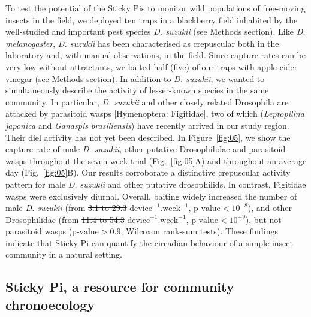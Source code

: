\documentclass[12pt]{article}
\providecommand{\DIFaddtex}[1]{{\protect\color{blue}\uwave{#1}}} %
\providecommand{\DIFdeltex}[1]{{\protect\color{red}\sout{#1}}}                      %
\providecommand{\DIFaddbegin}{} %
\providecommand{\DIFaddend}{} %
\providecommand{\DIFdelbegin}{} %
\providecommand{\DIFdelend}{} %
\providecommand{\DIFadd}[1]{\texorpdfstring{\DIFaddtex{#1}}{#1}} %
\providecommand{\DIFdel}[1]{\texorpdfstring{\DIFdeltex{#1}}{}} %
\newcommand{\DIFscaledelfig}{0.5}
\newlength{\DIFdelgraphicswidth} %
\newlength{\DIFdelgraphicsheight} %
\newcommand{\DIFaddincludegraphics}[2][]{{\color{blue}\fbox{\DIFOincludegraphics[#1]{#2}}}} %
\newcommand{\DIFdelincludegraphics}[2][]{%
\sbox{\DIFdelgraphicsbox}{\DIFOincludegraphics[#1]{#2}}%
\settoboxwidth{\DIFdelgraphicswidth}{\DIFdelgraphicsbox} %
\settoboxtotalheight{\DIFdelgraphicsheight}{\DIFdelgraphicsbox} %
\scalebox{\DIFscaledelfig}{%
\parbox[b]{\DIFdelgraphicswidth}{\usebox{\DIFdelgraphicsbox}\\[-\baselineskip] \rule{\DIFdelgraphicswidth}{0em}}\llap{\resizebox{\DIFdelgraphicswidth}{\DIFdelgraphicsheight}{%
\setlength{\unitlength}{\DIFdelgraphicswidth}%
\begin{picture}(1,1)%
\thicklines\linethickness{2pt} %
{\color[rgb]{1,0,0}\put(0,0){\framebox(1,1){}}}%
{\color[rgb]{1,0,0}\put(0,0){\line( 1,1){1}}}%
{\color[rgb]{1,0,0}\put(0,1){\line(1,-1){1}}}%
\end{picture}%
}\hspace*{3pt}}} %
} %
\DeclareRobustCommand{\DIFaddbegin}{\DIFOaddbegin \let\includegraphics\DIFaddincludegraphics} %
\DeclareRobustCommand{\DIFaddend}{\DIFOaddend \let\includegraphics\DIFOincludegraphics} %
\DeclareRobustCommand{\DIFdelbegin}{\DIFOdelbegin \let\includegraphics\DIFdelincludegraphics} %
\DeclareRobustCommand{\DIFdelend}{\DIFOaddend \let\includegraphics\DIFOincludegraphics} %
\begin{document}
\begin{linenumbers}
		To test the potential of the Sticky Pis to monitor wild populations of free-moving insects in the field, we deployed ten traps in a blackberry field inhabited by the well-studied and important pest species \emph{D. suzukii} (see Methods section). Like \emph{D. melanogaster}, \emph{D. suzukii} has been characterised as crepuscular both in the laboratory\cite{shaw_control_2019} and, with manual observations, in the field\cite{swoboda-bhattarai_diurnal_2020}. Since capture rates can be very low without attractants\cite{swoboda-bhattarai_diurnal_2020}, we baited half (five) of our traps with apple cider vinegar (see Methods section). In addition to \emph{D. suzukii}, we wanted to simultaneously describe the activity of lesser-known species in the same community. In particular, \emph{D. suzukii} and other closely related Drosophila are attacked by parasitoid wasps [Hymenoptera: Figitidae], two of which (\emph{Leptopilina japonica} and \emph{Ganaspis brasiliensis}) have recently arrived in our study region\cite{abram_new_2020}. Their diel activity has not yet been described. In Figure~\ref{fig:05}, we show the capture rate of male \emph{D. suzukii}, other putative Drosophilidae and parasitoid wasps throughout the seven-week trial (Fig.~\ref{fig:05}A) and throughout an average day (Fig.~\ref{fig:05}B). Our results corroborate a distinctive crepuscular activity pattern for male \emph{D. suzukii} and other putative drosophilids. In contrast, Figitidae wasps were exclusively diurnal. Overall, baiting widely increased the number of male \emph{D. suzukii} (from \DIFdelbegin \DIFdel{3.1 to 29.3 }\DIFdelend \DIFaddbegin \DIFadd{3.0 to 26.0 }\DIFaddend $\text{device}^{-1}.\text{week}^{-1}$, \DIFdelbegin \DIFdel{$\text{p-value} < 10^{-8}$}\DIFdelend \DIFaddbegin \DIFadd{$\text{p-value} < 2\times{}10^{-8}$}\DIFaddend ), and other Drosophilidae (from \DIFdelbegin \DIFdel{11.4 to 54.3 }\DIFdelend \DIFaddbegin \DIFadd{8.8 to 49.8 }\DIFaddend $\text{device}^{-1}.\text{week}^{-1}$, $\text{p-value} < 10^{-9}$), but not parasitoid wasps (\DIFdelbegin \DIFdel{$\text{p-value} > 0.9$}\DIFdelend \DIFaddbegin \DIFadd{$\text{p-value} > 0.65$}\DIFaddend , Wilcoxon rank-sum tests). These findings indicate that Sticky Pi can quantify the circadian behaviour of a simple insect community in a natural setting.

		\subsection*{Sticky Pi, a resource for community chronoecology}


\end{linenumbers}
\end{document}
